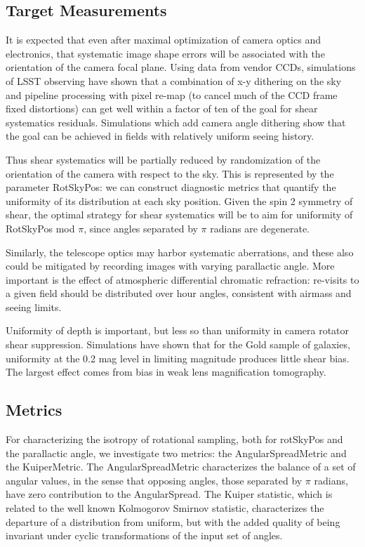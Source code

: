 \subsection{Target Measurements}

It is expected that even after maximal optimization of camera optics
and electronics, that systematic image shape errors will be associated
with the orientation of the camera focal plane.  Using data from vendor CCDs, simulations
of LSST observing have shown that a combination of x-y dithering on the sky and
pipeline processing with pixel re-map (to cancel much of the CCD frame fixed
distortions) can get well within a factor of ten of the goal for shear
systematics residuals.  Simulations which add camera angle dithering show
that the goal can be achieved in fields with relatively uniform seeing history.

Thus shear systematics will be partially reduced by randomization of the
orientation of the camera with respect to the sky.  This is
represented by the parameter RotSkyPos: we can construct diagnostic
metrics that quantify the uniformity of its distribution at each sky
position.   Given the spin 2 symmetry of shear, the optimal strategy for shear systematics
will be to aim for uniformity of RotSkyPos mod $\pi$, since angles separated by $\pi$ radians
are degenerate.

Similarly, the telescope optics may harbor systematic aberrations, and
these also could be mitigated by recording images with varying
parallactic angle.  More important is the effect of atmospheric differential chromatic
refraction: re-visits to a given field should be distributed over hour angles, consistent
with airmass and seeing limits.

Uniformity of depth is important, but less so than uniformity in camera
rotator shear suppression.  Simulations have shown that for the Gold sample of galaxies,
uniformity at the 0.2 mag level in limiting magnitude produces little shear bias. The
largest effect comes from bias in weak lens magnification tomography.


\subsection{Metrics}

For characterizing the isotropy of rotational sampling, both for rotSkyPos and the parallactic
angle, we investigate two metrics: the AngularSpreadMetric and the KuiperMetric.  The
AngularSpreadMetric characterizes the balance of a set of angular values, in the sense that opposing
angles, those separated by $\pi$ radians, have zero contribution to the AngularSpread.  The Kuiper
statistic, which is related to the well known Kolmogorov Smirnov statistic, characterizes the
departure of a distribution from uniform, but with the added quality of being invariant under cyclic
transformations of the input set of angles.

